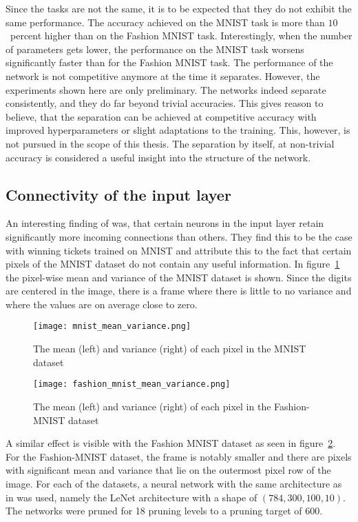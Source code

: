Since the tasks are not the same, it is to be expected that they do not exhibit the same performance.
The accuracy achieved on the MNIST task is more than $10$~percent higher than on the Fashion MNIST task.
Interestingly, when the number of parameters gets lower, the performance on the MNIST task worsens significantly faster than for the Fashion MNIST task.
The performance of the network is not competitive anymore at the time it separates.
However, the experiments shown here are only preliminary.
The networks indeed separate consistently, and they do far beyond trivial accuracies.
This gives reason to believe, that the separation can be achieved at competitive accuracy with improved hyperparameters or slight adaptations to the training.
This, however, is not pursued in the scope of this thesis.
The separation by itself, at non-trivial accuracy is considered a useful insight into the structure of the network.

\subsection{Connectivity of the input layer}
An interesting finding of \textcite{LTH} was, that certain neurons in the input layer retain significantly more incoming connections than others.
They find this to be the case with winning tickets trained on MNIST and attribute this to the fact that certain pixels of the MNIST dataset do not contain any useful information.
In figure~\ref{fig:mnist-input-variance} the pixel-wise mean and variance of the MNIST dataset is shown.
Since the digits are centered in the image, there is a frame where there is little to no variance and where the values are on average close to zero.

\begin{figure}[!ht] %
    \centering \texttt{[image: mnist\_mean\_variance.png]}
    \caption[Mean and Variance MNIST]{
    The mean (left) and variance (right) of each pixel in the MNIST dataset
    }\label{fig:mnist-input-variance}
\end{figure}
\begin{figure}[!ht] %
    \centering \texttt{[image: fashion\_mnist\_mean\_variance.png]}
    \caption[Mean and Variance Fashion-MNIST]{
        The mean (left) and variance (right) of each pixel in the Fashion-MNIST dataset
        }\label{fig:fashion-input-variance}
\end{figure}

A similar effect is visible with the Fashion MNIST dataset as seen in figure~\ref{fig:fashion-input-variance}.
For the Fashion-MNIST dataset, the frame is notably smaller and there are pixels with significant mean and variance that lie on the outermost pixel row of the image.
For each of the datasets, a neural network with the same architecture as in \autocite{LTH} was used, namely the LeNet architecture with a shape of $(784,300,100,10)$.
The networks were pruned for 18 pruning levels to a pruning target of {$600$}.

